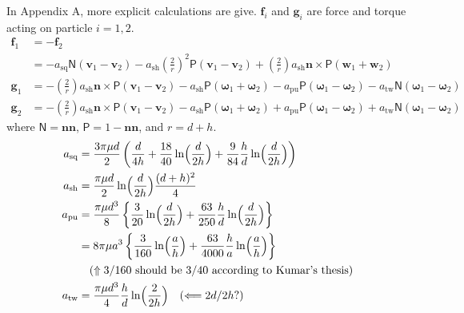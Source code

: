 \documentclass[12pt]{article}
\newcommand{\tens}[1]{\bm{\mathsf{#1}}}
\begin{document}
In Appendix A, more explicit calculations are give.
$\bm{f}_i$ and $\bm{g}_i$ are force and torque acting on particle $i = 1,2$.
\begin{align*}
 \bm{f}_1 & =  -\bm{f}_2 \\
&=- a_{\mathrm{sq}} \tens{N}  (\bm{v}_1 - \bm{v}_2)
- a_{\mathrm{sh}} \left(\frac{2}{r}\right)^2
\tens{P} (\bm{v}_1 - \bm{v}_2)
+ \left(\frac{2}{r}\right) a_{\mathrm{sh}}
\bm{n} \times \tens{P} (\bm{w}_1 + \bm{w}_2) \\
\bm{g}_1 &= 
-\left(\frac{2}{r}\right) a_{\mathrm{sh}}
\bm{n} \times \tens{P}(\bm{v}_1-\bm{v}_2)
- a_{\mathrm{sh}} \tens{P}(\bm{\omega}_1+\bm{\omega}_2)
- a_{\mathrm{pu}} \tens{P}(\bm{\omega}_1-\bm{\omega}_2)
- a_{\mathrm{tw}} \tens{N}(\bm{\omega}_1-\bm{\omega}_2) \\
\bm{g}_2 &= 
-\left(\frac{2}{r}\right) a_{\mathrm{sh}}
\bm{n} \times \tens{P}(\bm{v}_1-\bm{v}_2)
- a_{\mathrm{sh}} \tens{P}(\bm{\omega}_1+\bm{\omega}_2)
+ a_{\mathrm{pu}} \tens{P}(\bm{\omega}_1-\bm{\omega}_2)
+ a_{\mathrm{tw}} \tens{N}(\bm{\omega}_1-\bm{\omega}_2)
\end{align*}
where $\tens{N} = \bm{n}\bm{n}$,
$\tens{P} =1- \bm{n}\bm{n}$,
and 
$r = d + h$.
\begin{align*}
 a_{\mathrm{sq}}& = \frac{3 \pi \mu d}{2}
\left(
\frac{d}{4h} 
+ \frac{18}{40} \ln\Bigl( \frac{d}{2h}\Bigr)
+ \frac{9}{84} \frac{h}{d} \ln\Bigl( \frac{d}{2h}\Bigr)
\right)\\
 a_{\mathrm{sh}}
&= 
\frac{\pi \mu d }{2}
\ln\Bigl( \frac{d}{2h}\Bigr) \frac{(d+h)^2}{4}\\
 a_{\mathrm{pu}}& = 
\frac{\pi \mu d^3 }{8}
\left\{
\frac{3}{20}\ln\Bigl(\frac{d}{2h}\Bigr)
+
\frac{63}{250}\frac{h}{d}\ln\Bigl(\frac{d}{2h}\Bigr)
\right\}\\
& = 
8 \pi \mu a^3 
\left\{
\frac{3}{160}\ln\Bigl(\frac{a}{h}\Bigr)
+
\frac{63}{4000}\frac{h}{a}\ln\Bigl(\frac{a}{h}\Bigr)
\right\} \\
&\quad (\Uparrow
\text{$3/160$ should be $3/40$ according to Kumar's thesis})
\\
a_{\mathrm{tw}}
 &= 
\frac{\pi \mu d^3 }{4}
\frac{h}{d}
\ln\Bigl(\frac{2}{2h}\Bigr) \quad (\Longleftarrow\text{$2d/2h$?})
\end{align*}
\end{document}
